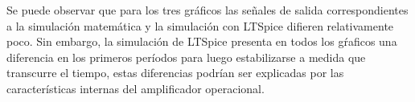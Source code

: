 Se puede observar que para los tres gráficos las señales de salida correspondientes a la simulación matemática y la simulación con LTSpice difieren relativamente poco. Sin embargo, la simulación de LTSpice presenta en todos los gŕaficos una diferencia en los primeros períodos  para luego estabilizarse a medida que transcurre el tiempo, estas diferencias podrían ser explicadas por las características internas del amplificador operacional.
